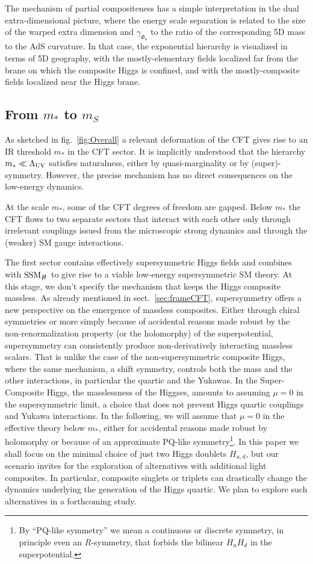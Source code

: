 \documentclass[a4paper,12pt]{article}
\def\fig#1{fig.~\ref{#1}}
\def\fig#1{fig.~\ref{#1}}
\def\sec#1{sect.~\ref{#1}}
\def\LUV{\Lambda_{\rm UV}}
\def\mst{m_*}
\def\mS{m_S}
\def\SSMnH{{\rm SSM}_{H \!\!\!\!\!\not\,\,\,\,\,}}
\begin{document}
The mechanism of partial compositeness has a simple interpretation in the dual extra-dimensional picture, where the energy scale separation is related to the size of the warped extra dimension and $\gamma_{\Phi_a}$ to the ratio of the corresponding 5D mass to the AdS curvature. In that case, the exponential hierarchy is visualized in terms of 5D geography, with the mostly-elementary fields localized far from the brane on which the composite Higgs is confined, and with the mostly-composite fields localized near the Higgs brane.

\boldmath
\subsection{From $\mst$ to $\mS$}
\label{sec:msts}
\unboldmath

As sketched in \fig{fig:Overall} a relevant deformation of the CFT gives rise to an IR threshold $\mst$ in the CFT sector. It is implicitly understood that the hierarchy $\mst\ll\LUV$  satisfies naturalness,  either by quasi-marginality or by (super)-symmetry. However, the precise mechanism has no direct consequences on the low-energy dynamics.

At the scale $\mst$, some of the CFT degrees of freedom are gapped. Below $\mst$ the CFT  flows to two separate sectors that interact with each other only through irrelevant couplings issued from the microscopic strong dynamics and through the (weaker) SM gauge interactions.

The first sector contains effectively supersymmetric Higgs fields and combines with $\SSMnH$ to give rise to a viable low-energy supersymmetric SM theory. At this stage, we don't specify the mechanism that keeps the Higgs composite massless. As already mentioned in \sec{sec:frameCFT}, supersymmetry offers a new perspective on the emergence of  massless composites. Either through chiral symmetries or more simply because of accidental reasons made robust by the non-renormalization property (or the holomorphy) of the superpotential, supersymmetry can consistently produce non-derivatively interacting massless scalars. That is unlike the case of the non-supersymmetric composite Higgs, where the same  mechanism, a shift symmetry, controls both the mass and the other interactions, in particular the quartic and the Yukawas. In the Super-Composite Higgs, the masslessness of the Higgses, amounts to assuming  $\mu=0$ in the supersymmetric limit, a choice that  does not prevent Higgs quartic couplings and Yukawa interactions. In the following, we will assume that $\mu=0$ in the effective theory below $\mst$, either for accidental reasons made robust by holomorphy or because of an approximate PQ-like symmetry\footnote{By ``PQ-like symmetry'' we mean a continuous or discrete symmetry, in principle even an $R$-symmetry, that forbids the bilinear $H_u H_d$ in the superpotential.}. In this paper we shall  focus on the minimal choice of just two Higgs doublets $H_{u,d}$, but our scenario invites  for the exploration of alternatives with  additional light composites. In particular, composite singlets or triplets can drastically change the dynamics underlying the generation of the Higgs quartic. We plan to explore such alternatives in a forthcoming study.
\end{document}
